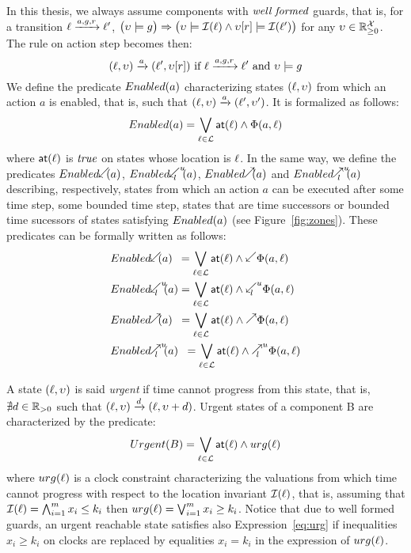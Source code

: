 In this thesis, we always assume components with $\emph{well formed}$
guards, that is, for a transition $\ell\xrightarrow{a,g,r}\ell'$,
$\big(\upsilon\models g\big)\Rightarrow\big(\upsilon\models\mathcal{I}(\ell)\wedge\upsilon[r]\models
\mathcal{I}(\ell')\big)$ for any $\upsilon\in\mathbb{R}_{\ge 0}^{\mathcal{X}}$. The rule on action step becomes then:
\begin{displaymath}
  (\ell,\upsilon)\xrightarrow{a}(\ell',\upsilon[r])\text{ if } \ell\xrightarrow{a,g,r}
      \ell'\text{ and } \upsilon\models g 
\end{displaymath}
We define the predicate $Enabled(a)$ characterizing states $(\ell,\upsilon)$
from which an action $a$ is enabled, that is, such that $(\ell,\upsilon)
\xrightarrow{a}(\ell',\upsilon')$. It is formalized as follows:
\begin{displaymath}
  Enabled(a)=\bigvee_{\ell\in\mathcal{L}}\textsf{at}(\ell)\wedge\Phi(a,\ell)
\end{displaymath}
where $\textsf{at}(\ell)$ is $\textnormal{\textit{true}}$ on states whose location is $\ell$.
In the same way, we define the predicates $\enabledbackward{a}$,
$\enabledbackwardb{a}{l}{u}$, $\enabledforward{a}$ and $\enabledforwardb{a}{l}{u}$ 
describing, respectively, states from which an action $a$ can be executed after some time step,
some bounded time step, states that are time successors or bounded time sucessors of states 
satisfying $Enabled(a)$ (see Figure~\ref{fig:zones}). 
These predicates can be formally written as follows:
\begin{align*}
  &\enabledbackward{a}\hspace{1.8mm}=\bigvee_{\loc\in\Loc}\al{\loc}\wedge
  \backward\Phi(a,\loc)  \\
  &\enabledbackwardb{a}{l}{u}=\bigvee_{\loc\in\Loc}\al{\loc}\wedge
  \backwardp{l}{u}\Phi(a,\loc)\\
  &\enabledforward{a}\hspace{1.9mm}=\bigvee_{\loc\in\Loc}\al{\loc}\wedge
  \forward\Phi(a,\loc)\\
  &\enabledforwardb{a}{l}{u}\hspace{1.9mm}=\bigvee_{\loc\in\Loc}\al{\loc}\wedge
  \forwardp{l}{u}\Phi(a,\loc)
\end{align*}

A state $(\ell,\upsilon)$ is said \emph{urgent} if time cannot progress from
this state, that is, $\nexists d\in\mathbb{R}_{> 0}$ such that $(\ell,\upsilon)\xrightarrow{d}
(\ell,\upsilon+d)$. Urgent states of a component B are characterized by the predicate:
\begin{equation}\label{eq:urg}
  Urgent(B)=\bigvee_{\ell\in\mathcal{L}}\textsf{at}(\ell)\wedge urg(\ell)
\end{equation}
where $urg(\ell)$ is a clock constraint characterizing the valuations from
which time cannot progress with respect to the location invariant 
$\mathcal{I}(\ell)$, that is, assuming that 
$\mathcal{I}(\ell)=\bigwedge_{i=1}^m x_i\le k_i$ then 
$urg(\ell)=\bigvee_{i=1}^m x_i\ge k_i$. Notice that due to well formed
guards, an urgent reachable state satisfies also Expression~\ref{eq:urg} if inequalities
$x_i\ge k_i$ on clocks are replaced by equalities $x_i=k_i$ in the expression
of $urg(\ell)$.

